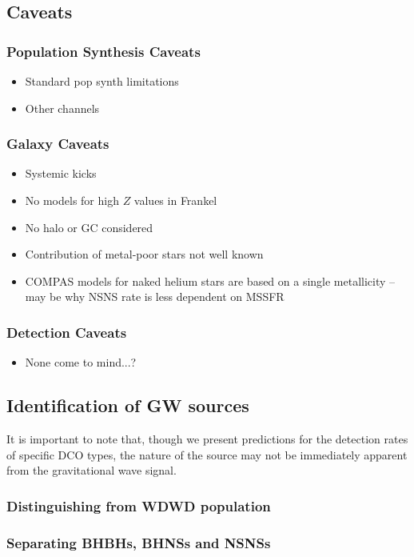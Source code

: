 \subsection{Caveats}

\subsubsection{Population Synthesis Caveats}
\begin{itemize}
    \item Standard pop synth limitations
    \item Other channels
\end{itemize}

\subsubsection{Galaxy Caveats}
\begin{itemize}
    \item Systemic kicks
    \item No models for high $Z$ values in Frankel
    \item No halo or GC considered %
    \item Contribution of metal-poor stars not well known
    \item COMPAS models for naked helium stars are based on a single metallicity -- may be why NSNS rate is less dependent on MSSFR
\end{itemize}

\subsubsection{Detection Caveats}
\begin{itemize}
    \item None come to mind...?
\end{itemize}

\subsection{Identification of GW sources}
It is important to note that, though we present predictions for the detection rates of specific DCO types, the nature of the source may not be immediately apparent from the gravitational wave signal.

\subsubsection{Distinguishing from WDWD population}
\subsubsection{Separating BHBHs, BHNSs and NSNSs}